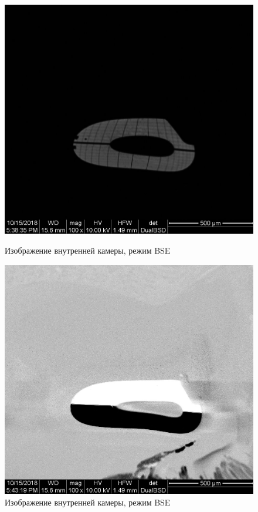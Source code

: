 \documentclass[a4paper]{article}
\begin{document}
\begin{enumerate}
    \begin{figure}[h]
\begin{center}
\begin{minipage}[h]{0.45\linewidth}
\includegraphics[width=1\linewidth]{z1_002.jpg}
\caption{Изображение внутренней камеры, режим BSE} %
\end{minipage}
\hfill 
\begin{minipage}[h]{0.45\linewidth}
\includegraphics[width=1\linewidth]{z1_003.jpg}
\caption{Изображение внутренней камеры, режим BSE}
\label{ris:experimcoded}
\end{minipage}
\end{center}
\end{figure}


\end{enumerate}
\end{document}
